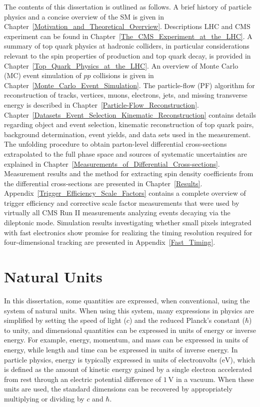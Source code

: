 The contents of this dissertation is outlined as follows.
A brief history of particle physics and a concise overview of the SM is given in Chapter~\ref{Motivation_and_Theoretical_Overview}.
Descriptions LHC and CMS experiment can be found in Chapter~\ref{The_CMS_Experiment_at_the_LHC}.
A summary of top quark physics at hadronic colliders, in particular considerations relevant to the spin properties of \ttbar production and top quark decay, is provided in Chapter~\ref{Top_Quark_Physics_at_the_LHC}. 
An overview of Monte Carlo (MC) event simulation of $pp$ collisions is given in Chapter~\ref{Monte_Carlo_Event_Simulation}.
The particle-flow (PF) algorithm for reconstruction of tracks, vertices, muons, electrons, jets, and missing transverse energy is described in Chapter~\ref{Particle-Flow_Reconstruction}.
Chapter~\ref{Datasets_Event_Selection_Kinematic_Reconstruction} contains details regarding object and event selection, kinematic reconstruction of top quark pairs, background determination, event yields, and data sets used in the measurement.
The unfolding procedure to obtain parton-level differential cross-sections extrapolated to the full phase space and sources of systematic uncertainties are explained in Chapter~\ref{Measurements_of_Differential_Cross-sections}.
Measurement results and the method for extracting spin density coefficients from the differential cross-sections are presented in Chapter~\ref{Results}.
Appendix~\ref{Trigger_Efficiency_Scale_Factors} contains a complete overview of trigger efficiency and corrective scale factor measurements that were used by virtually all CMS Run II measurements analyzing \ttbar events decaying via the dileptonic mode.
Simulation results investigating whether small pixels integrated with fast electronics show promise for realizing the timing resolution required for four-dimensional tracking are presented in Appendix~\ref{Fast_Timing}.

\section{Natural Units}
In this dissertation, some quantities are expressed, when conventional, using the system of natural units.
When using this system, many expressions in physics are simplified by setting the speed of light ($c$) and the reduced Planck's constant ($\hbar$) to unity, and dimensional quantities can be expressed in units of energy or inverse energy.
For example, energy, momentum, and mass can be expressed in units of energy, while length and time can be expressed in units of inverse energy.
In particle physics, energy is typically expressed in units of electronvolts ($\si{\eV}$), which is defined as the amount of kinetic energy gained by a single electron accelerated from rest through an electric potential difference of $\SI{1}{\V}$ in a vacuum.
When these units are used, the standard dimensions can be recovered by appropriately multiplying or dividing by $c$ and $\hbar$.